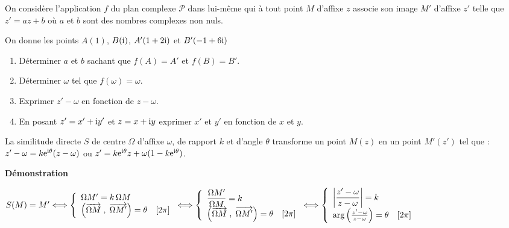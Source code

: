  \begin{lemma}

On considère l'application $ f $ du plan complexe $ \mathcal{P} $  dans lui-même qui à tout point $ M $ d'affixe $ z $ associe  son image $ M' $ d'affixe $ z' $ telle que $ z'=a z+b$  où $ a$ et $ b$ sont des nombres complexes non nuls. 

\medskip
On donne les points $ A(1) $, $ B(\text{i})$,  $ A'(1+2\text{i})$ et  $ B'(-1+6\text{i})$
\begin{enumerate}
\item Déterminer $ a$ et $ b$ sachant que $ f(A)=A' $  et $ f(B)=B' $.
\item Déterminer $ \omega $ tel que $ f(\omega)=\omega $.
\item Exprimer  $ z'-\omega $ en fonction de $ z-\omega $.
\item En posant  $ z'=x'+\text{i} y' $ et $ z=x+\text{i} y$ exprimer $ x' $ et $ y' $ en fonction de $ x$ et $ y$.
\end{enumerate}
 \end{lemma}
\begin{theorem}
La similitude directe  $ S $ de centre $ \Omega $  d'affixe $ \omega $, de rapport $ k $ et d'angle $ \theta $  transforme un point  $ M( z )$  en un point $ M'(z ')$  tel que : $ z'-\omega =k\mathrm{e}^{\text{i} \theta}(z-\omega) $ ou  $ z'=k\mathrm{e}^{\text{i} \theta}z +\omega(1-k\mathrm{e}^{\text{i} \theta}) $.
 
\end{theorem}

\textbf{Démonstration}

\medskip
 $ S(M)=M'\Longleftrightarrow \left\{\begin{array}{l c l}
\Omega M'=k \,\Omega M\\	 
\left(\overrightarrow{\Omega M}\; ,\;  \overrightarrow{\Omega M'}\right) =\theta \quad  [2\pi]
\end{array}\right.  \Longleftrightarrow   \left\{\begin{array}{l c l}
\dfrac{\Omega M'}{\Omega M}=k \\ 	 
\left(\overrightarrow{\Omega M}\; ,\;  \overrightarrow{\Omega M'}\right) =\theta \quad  [2\pi]
\end{array}\right. \Longleftrightarrow  \left\{\begin{array}{l c l}
\left\lvert \dfrac{z'-\omega}{z-\omega} \right\rvert=k \\ 	 
\text{arg}\left(\frac{z'-\omega}{z-\omega}\right) =\theta \quad  [2\pi]
\end{array}\right. $

